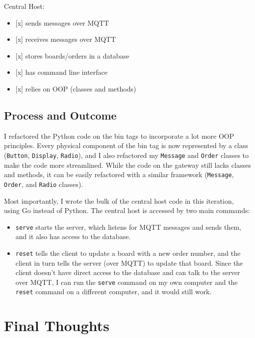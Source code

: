 \documentclass{article}
\begin{document}
\noindent
Central Host:

\begin{itemize}
\item
  {[}x{]} sends messages over MQTT
\item
  {[}x{]} receives messages over MQTT
\item
  {[}x{]} stores boards/orders in a database
\item
  {[}x{]} has command line interface
\item
  {[}x{]} relies on OOP (classes and methods)
\end{itemize}

\subsection{Process and Outcome}\label{process-and-outcome-3}

I refactored the Python code on the bin tags to incorporate a lot more
OOP principles. Every physical component of the bin tag is now
represented by a class (\texttt{Button}, \texttt{Display},
\texttt{Radio}), and I also refactored my \texttt{Message} and
\texttt{Order} classes to make the code more streamlined. While the code
on the gateway still lacks classes and methods, it can be easily
refactored with a similar framework (\texttt{Message}, \texttt{Order},
and \texttt{Radio} classes).

Most importantly, I wrote the bulk of the central host code in this
iteration, using Go instead of Python. The central host is accessed by
two main commands:

\begin{itemize}
\item
  \texttt{serve} starts the server, which listens for MQTT messages and
  sends them, and it also has access to the database.
\item
  \texttt{reset} tells the client to update a board with a new order
  number, and the client in turn tells the server (over MQTT) to update
  that board. Since the client doesn't have direct access to the
  database and can talk to the server over MQTT, I can run the
  \texttt{serve} command on my own computer and the \texttt{reset}
  command on a different computer, and it would still work.
\end{itemize}

\section{Final Thoughts}\label{final-thoughts}
\end{document}
